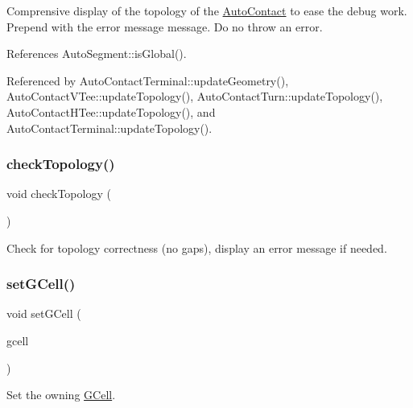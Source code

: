 Comprensive display of the topology of the \mbox{\hyperlink{classKatabatic_1_1AutoContact}{Auto\+Contact}} to ease the debug work. Prepend with the error message {\ttfamily message}. Do no throw an error. 

References Auto\+Segment\+::is\+Global().



Referenced by Auto\+Contact\+Terminal\+::update\+Geometry(), Auto\+Contact\+V\+Tee\+::update\+Topology(), Auto\+Contact\+Turn\+::update\+Topology(), Auto\+Contact\+H\+Tee\+::update\+Topology(), and Auto\+Contact\+Terminal\+::update\+Topology().

\mbox{\label{classKatabatic_1_1AutoContact_ac371cd5b837a8965c11297c197e70a45}} 
\subsubsection{\texorpdfstring{check\+Topology()}{checkTopology()}}
{\footnotesize\ttfamily void check\+Topology (\begin{DoxyParamCaption}{ }\end{DoxyParamCaption})\hspace{0.3cm}{\ttfamily [virtual]}}

Check for topology correctness (no gaps), display an error message if needed. \mbox{\label{classKatabatic_1_1AutoContact_aa1a02e206437f1371a74cafc724b00d7}} 
\subsubsection{\texorpdfstring{set\+G\+Cell()}{setGCell()}}
{\footnotesize\ttfamily void set\+G\+Cell (\begin{DoxyParamCaption}\item[{\mbox{\hyperlink{classKatabatic_1_1GCell}{G\+Cell}} $\ast$}]{gcell }\end{DoxyParamCaption})}

Set the owning \mbox{\hyperlink{classKatabatic_1_1GCell}{G\+Cell}}. 


